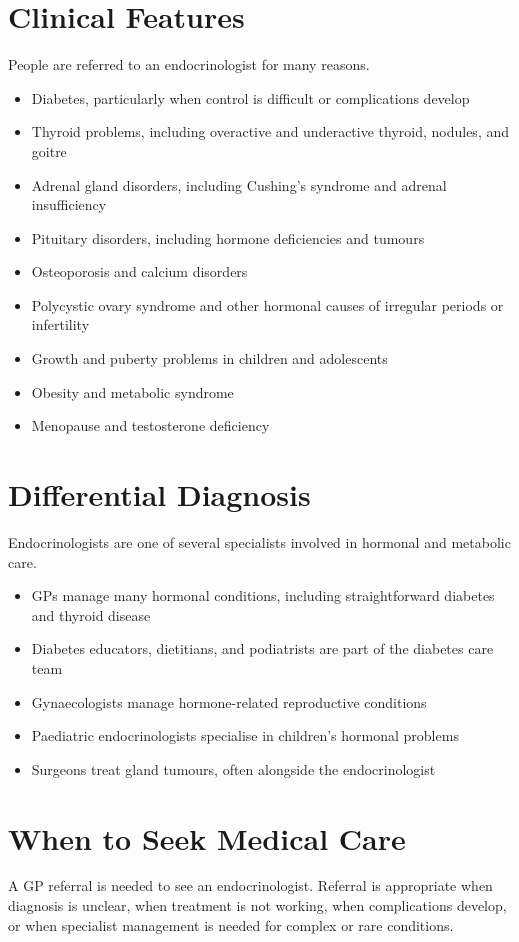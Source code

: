 \section*{Clinical Features}
People are referred to an endocrinologist for many reasons.
\begin{itemize}
    \item Diabetes, particularly when control is difficult or complications develop
    \item Thyroid problems, including overactive and underactive thyroid, nodules, and goitre
    \item Adrenal gland disorders, including Cushing's syndrome and adrenal insufficiency
    \item Pituitary disorders, including hormone deficiencies and tumours
    \item Osteoporosis and calcium disorders
    \item Polycystic ovary syndrome and other hormonal causes of irregular periods or infertility
    \item Growth and puberty problems in children and adolescents
    \item Obesity and metabolic syndrome
    \item Menopause and testosterone deficiency
\end{itemize}

\section*{Differential Diagnosis}
Endocrinologists are one of several specialists involved in hormonal and metabolic care.
\begin{itemize}
    \item GPs manage many hormonal conditions, including straightforward diabetes and thyroid disease
    \item Diabetes educators, dietitians, and podiatrists are part of the diabetes care team
    \item Gynaecologists manage hormone-related reproductive conditions
    \item Paediatric endocrinologists specialise in children's hormonal problems
    \item Surgeons treat gland tumours, often alongside the endocrinologist
\end{itemize}

\section*{When to Seek Medical Care}
A GP referral is needed to see an endocrinologist. Referral is appropriate when diagnosis is unclear, when treatment is not working, when complications develop, or when specialist management is needed for complex or rare conditions.

